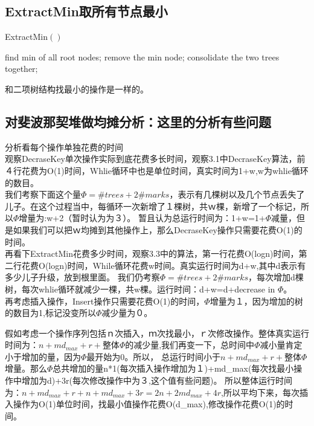 \subsection{ExtractMin取所有节点最小}
{\sc ExtractMin}$()$
\begin{algorithmic}[1]
\STATE find min of all root nodes; 
\STATE remove the min node; 
\STATE consolidate the two trees together;
\ENDWHILE	
\end{algorithmic}

和二项树结构找最小的操作是一样的。

\subsection{对斐波那契堆做均摊分析：这里的分析有些问题}

分析看每个操作单独花费的时间\\
观察DecraseKey单次操作实际到底花费多长时间，观察3.1中DecraseKey算法，前４行花费为O(1)时间，Whlie循环中也是单位时间，真实时间为1+w,w为whlie循环的数目。　\\
我们考察下面这个量$\Phi = \#trees+2\#marks$，表示有几棵树以及几个节点丢失了儿子。在这个过程当中，每循环一次新增了１棵树，共ｗ棵，新增了一个标记，所以$\Phi$增量为:w+2（暂时认为为３）。
暂且认为总运行时间为：1+w=1+$\Phi$减量，但是如果我们可以把ｗ均摊到其他操作上，那么DecraseKey操作只需要花费O(1)的时间。\\

再看下ExtractMin花费多少时间，观察3.3中的算法，第一行花费O(logn)时间，第二行花费O(logn)时间，While循环花费w时间。真实运行时间为d+w,其中d表示有多少儿子升级，放到根里面。
我们仍考察$\Phi = \#trees+2\#marks$，每次增加d棵树，每次whlie循环就减少一棵，共w棵。运行时间：d+w=d+decrease in $\Phi$。\\

再考虑插入操作，Insert操作只需要花费O(1)的时间，$\Phi$增量为１，因为增加的树的数目为1,标记没变所以$\Phi$减少量为０。

假如考虑一个操作序列包括ｎ次插入，ｍ次找最小，ｒ次修改操作。整体真实运行时间为：$n+md_{max}+r+$整体$\Phi$的减少量,我们再变一下，总时间中$\Phi$减小量肯定小于增加的量，因为$\Phi$最开始为0。所以，
总运行时间小于$n+md_{max}+r+$整体$\Phi$增量。那么$\Phi$总共增加的量n*1(每次插入操作增加为１)+md\_{max}(每次找最小操作中增加为d)+3r(每次修改操作中为３,这个值有些问题)。
所以整体运行时间为：$n+md_{max}+r+n+md_{max}+3r = 2n+2md_{max}+4r$,所以平均下来，每次插入操作为O(1)单位时间，找最小值操作花费O(d\_{max}),修改操作花费O(1)的时间。

